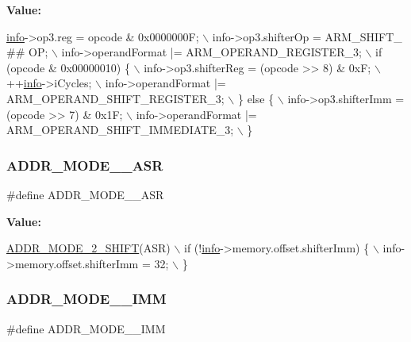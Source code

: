 {\bfseries Value\+:}
\begin{DoxyCode}
\mbox{\hyperlink{libretro_8h_structretro__game__info}{info}}->op3.reg = opcode & 0x0000000F; \(\backslash\)
    info->op3.shifterOp = ARM\_SHIFT\_ ## OP; \(\backslash\)
    info->operandFormat |= ARM\_OPERAND\_REGISTER\_3; \(\backslash\)
    if (opcode & 0x00000010) \{ \(\backslash\)
        info->op3.shifterReg = (opcode >> 8) & 0xF; \(\backslash\)
        ++\mbox{\hyperlink{libretro_8h_structretro__game__info}{info}}->iCycles; \(\backslash\)
        info->operandFormat |= ARM\_OPERAND\_SHIFT\_REGISTER\_3; \(\backslash\)
    \} \textcolor{keywordflow}{else} \{ \(\backslash\)
        info->op3.shifterImm = (opcode >> 7) & 0x1F; \(\backslash\)
        info->operandFormat |= ARM\_OPERAND\_SHIFT\_IMMEDIATE\_3; \(\backslash\)
    \}
\end{DoxyCode}
\mbox{\label{decoder-arm_8c_ada13cb8a55fb5c07e68d39c1e71145e6}} 
\subsubsection{\texorpdfstring{A\+D\+D\+R\+\_\+\+M\+O\+D\+E\+\_\+\_\+\+A\+SR}{ADDR\_MODE\_2\_ASR}}
{\footnotesize\ttfamily \#define A\+D\+D\+R\+\_\+\+M\+O\+D\+E\+\_\+\_\+\+A\+SR}

{\bfseries Value\+:}
\begin{DoxyCode}
\mbox{\hyperlink{decoder-arm_8c_a942a66a3ff232d8a62b8f6714fee9858}{ADDR\_MODE\_2\_SHIFT}}(ASR) \(\backslash\)
    if (!\mbox{\hyperlink{libretro_8h_structretro__game__info}{info}}->memory.offset.shifterImm) \{ \(\backslash\)
        info->memory.offset.shifterImm = 32; \(\backslash\)
    \}
\end{DoxyCode}
\mbox{\label{decoder-arm_8c_a864abdc617c4084e38b641387039ce1d}} 
\subsubsection{\texorpdfstring{A\+D\+D\+R\+\_\+\+M\+O\+D\+E\+\_\+\_\+\+I\+MM}{ADDR\_MODE\_2\_IMM}}
{\footnotesize\ttfamily \#define A\+D\+D\+R\+\_\+\+M\+O\+D\+E\+\_\+\_\+\+I\+MM}

